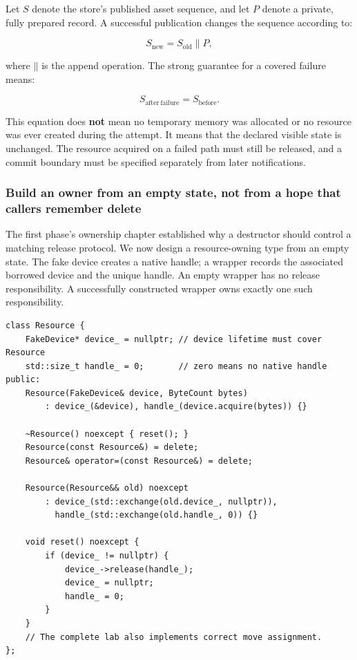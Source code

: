 Let \(S\) denote the store's published asset sequence, and let \(P\) denote a private, fully prepared record. A successful publication changes the sequence according to:

\[
S_{\mathrm{new}} = S_{\mathrm{old}} \mathbin{\|} P,
\]

where \(\mathbin{\|}\) is the append operation. The strong guarantee for a covered failure means:

\[
S_{\mathrm{after\ failure}} = S_{\mathrm{before}}.
\]

This equation does \textbf{not} mean no temporary memory was allocated or no resource was ever created during the attempt. It means that the declared visible state is unchanged. The resource acquired on a failed path must still be released, and a commit boundary must be specified separately from later notifications.

\subsubsection{Build an owner from an empty state, not from a hope that callers remember delete}\label{build-an-owner-from-an-empty-state-not-from-a-hope-that-callers-remember-delete}

The first phase's ownership chapter established why a destructor should control a matching release protocol. We now design a resource-owning type from an empty state. The fake device creates a native handle; a wrapper records the associated borrowed device and the unique handle. An empty wrapper has no release responsibility. A successfully constructed wrapper owns exactly one such responsibility.

\begin{verbatim}
class Resource {
    FakeDevice* device_ = nullptr; // device lifetime must cover Resource
    std::size_t handle_ = 0;       // zero means no native handle
public:
    Resource(FakeDevice& device, ByteCount bytes)
        : device_(&device), handle_(device.acquire(bytes)) {}

    ~Resource() noexcept { reset(); }
    Resource(const Resource&) = delete;
    Resource& operator=(const Resource&) = delete;

    Resource(Resource&& old) noexcept
        : device_(std::exchange(old.device_, nullptr)),
          handle_(std::exchange(old.handle_, 0)) {}

    void reset() noexcept {
        if (device_ != nullptr) {
            device_->release(handle_);
            device_ = nullptr;
            handle_ = 0;
        }
    }
    // The complete lab also implements correct move assignment.
};
\end{verbatim}

